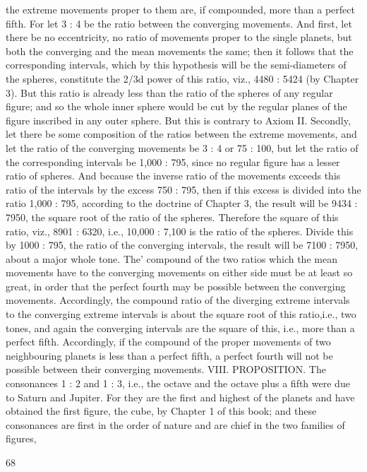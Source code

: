\documentclass{article}
\begin{document}
the extreme movements proper to them are, if compounded, more than
a perfect fifth.
For let 3 : 4 be the ratio between the converging movements. And first,
let there be no eccentricity, no ratio of movements proper to the single
planets, but both the converging and the mean movements the same;
then it follows that the corresponding intervals, which by this hypothesis
will be the semi-diameters of the spheres, constitute the 2/3d power of
this ratio, viz., 4480 : 5424 (by Chapter 3). But this ratio is already less
than the ratio of the spheres of any regular figure; and so the whole inner
sphere would be cut by the regular planes of the figure inscribed in any
outer sphere. But this is contrary to Axiom II.
Secondly, let there be some composition of the ratios between the
extreme movements, and let the ratio of the converging movements be 3
: 4 or 75 : 100, but let the ratio of the corresponding intervals be 1,000 :
795, since no regular figure has a lesser ratio of spheres. And because the
inverse ratio of the movements exceeds this ratio of the intervals by the
excess 750 : 795, then if this excess is divided into the ratio 1,000 : 795,
according to the doctrine of Chapter 3, the result will be 9434 : 7950, the
square root of the ratio of the spheres. Therefore the square of this
ratio, viz., 8901 : 6320, i.e., 10,000 : 7,100 is the ratio of the spheres.
Divide this by 1000 : 795, the ratio of the converging intervals, the result
will be 7100 : 7950, about a major whole tone. The' compound of the two
ratios which the mean movements have to the converging movements on
either side must be at least so great, in order that the perfect fourth may
be possible between the converging movements. Accordingly, the
compound ratio of the diverging extreme intervals to the converging
extreme intervals is about the square root of this ratio,i.e., two tones, and
again the converging intervals are the square of this, i.e., more than a
perfect fifth. Accordingly, if the compound of the proper movements of
two neighbouring planets is less than a perfect fifth, a perfect fourth will
not be possible between their converging movements.
VIII. PROPOSITION. The consonances 1 : 2 and 1 : 3, i.e., the octave and
the octave plus a fifth were due to Saturn and Jupiter.
For they are the first and highest of the planets and have obtained the
first figure, the cube, by Chapter 1 of this book; and these consonances
are first in the order of nature and are chief in the two families of figures,


68
\end{document}
